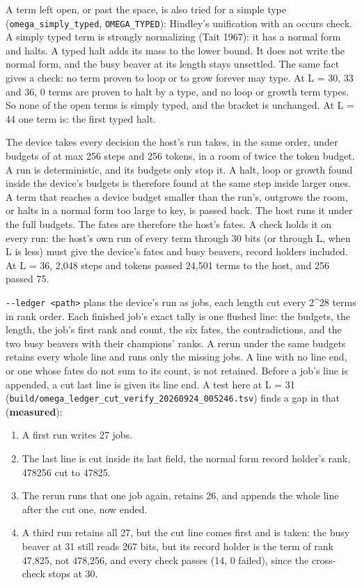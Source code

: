 A term left open, or past the space, is also tried for a simple type (\texttt{omega\_\allowbreak{}simply\_\allowbreak{}typed}, \texttt{OMEGA\_\allowbreak{}TYPED}): Hindley's unification with an occurs check. A simply typed term is strongly normalizing (Tait 1967): it has a normal form and halts. A typed halt adds its mass to the lower bound. It does not write the normal form, and the busy beaver at its length stays unsettled. The same fact gives a check: no term proven to loop or to grow forever may type. At L = 30, 33 and 36, 0 terms are proven to halt by a type, and no loop or growth term types. So none of the open terms is simply typed, and the bracket is unchanged. At L = 44 one term is: the first typed halt.

The device takes every decision the host's run takes, in the same order, under budgets of at max 256 steps and 256 tokens, in a room of twice the token budget. A run is deterministic, and its budgets only stop it. A halt, loop or growth found inside the device's budgets is therefore found at the same step inside larger ones. A term that reaches a device budget smaller than the run's, outgrows the room, or halts in a normal form too large to key, is passed back. The host runs it under the full budgets. The fates are therefore the host's fates. A check holds it on every run: the host's own run of every term through 30 bits (or through L, when L is less) must give the device's fates and busy beavers, record holders included. At L = 36, 2,048 steps and tokens passed 24,501 terms to the host, and 256 passed 75.

\texttt{-\allowbreak{}-\allowbreak{}ledger <path>} plans the device's run as jobs, each length cut every 2\textasciicircum{}28 terms in rank order. Each finished job's exact tally is one flushed line: the budgets, the length, the job's first rank and count, the six fates, the contradictions, and the two busy beavers with their champions' ranks. A rerun under the same budgets retains every whole line and runs only the missing jobs. A line with no line end, or one whose fates do not sum to its count, is not retained. Before a job's line is appended, a cut last line is given its line end. A test here at L = 31 (\texttt{build/\allowbreak{}omega\_\allowbreak{}ledger\_\allowbreak{}cut\_\allowbreak{}verify\_\allowbreak{}20260924\_\allowbreak{}005246.\allowbreak{}tsv}) finds a gap in that (\textbf{measured}):

\begin{enumerate}
\item A first run writes 27 jobs.
\item The last line is cut inside its last field, the normal form record holder's rank, 478256 cut to 47825.
\item The rerun runs that one job again, retains 26, and appends the whole line after the cut one, now ended.
\item A third run retains all 27, but the cut line comes first and is taken: the busy beaver at 31 still reads 267 bits, but its record holder is the term of rank 47,825, not 478,256, and every check passes (14, 0 failed), since the cross-check stops at 30.
\end{enumerate}

